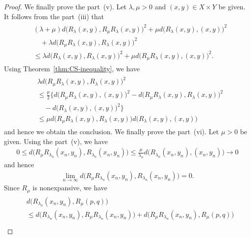 \documentclass[draft]{amsart}
\numberwithin{equation}{section}
\theoremstyle{plain}
\theoremstyle{definition}
\theoremstyle{remark}
\begin{document}
\begin{proof}
 We finally prove the part~(v). 
 Let $\lambda, \mu>0$ and $(x,y)\in X\times Y$ be given. 
 It follows from the part~(iii) that 
 \begin{align}
 \begin{split}
  &(\lambda+\mu)d\bigl(R_{\lambda}(x,y), R_{\mu}R_{\lambda}(x,y)\bigr)^2
 +\mu d\bigl(R_{\lambda}(x,y), (x,y)\bigr)^2 \\
  &\quad +\lambda d\bigl(R_{\mu}R_{\lambda}(x,y), R_{\lambda}(x,y)\bigr)^2 \\
  &\leq \lambda d\bigl(R_{\lambda}(x,y), R_{\lambda}(x,y)\bigr)^2
+\mu d\bigl(R_{\mu}R_{\lambda}(x,y), (x,y)\bigr)^2.   
 \end{split}
 \end{align} 
 Using Theorem~\ref{thm:CS-inequality}, we have 
 \begin{align}
 \begin{split}
  &\lambda d\bigl(R_{\mu}R_{\lambda}(x,y), R_{\lambda}(x,y)\bigr)^2 \\
  &\leq 
  \frac{\mu}{2}\bigl\{
  d\bigl(R_{\mu}R_{\lambda}(x,y), (x,y)\bigr)^2 
 - d\bigl(R_{\mu}R_{\lambda}(x,y),R_{\lambda}(x,y)\bigr)^2 \\
 &\quad - d\bigl(R_{\lambda}(x,y), (x,y)\bigr)^2 
  \bigr\} \\
  &\leq \mu d\bigl(R_{\mu}R_{\lambda}(x,y), R_{\lambda}(x,y)\bigr) 
d\bigl(R_{\lambda}(x,y), (x,y)\bigr)  
 \end{split}
 \end{align} 
 and hence we obtain the conclusion. 
 We finally prove the part~(vi). Let $\mu>0$ be given. 
 Using the part~(v), we have 
 \begin{align}
  0\leq 
  d\bigl(
  R_{\mu}R_{\lambda_n}(x_{n},y_{n}), R_{\lambda_n}(x_{n},y_{n})
  \bigr)
  \leq \frac{\mu}{\lambda_n}
  d\bigl(
  R_{\lambda_n}(x_{n},y_{n}), (x_{n},y_{n})
  \bigr)\to 0
 \end{align}
 and hence 
 \begin{align}
  \lim_{n\to \infty}d\bigl(
  R_{\mu}R_{\lambda_n}(x_{n},y_{n}), R_{\lambda_n}(x_{n},y_{n})
  \bigr)=0. 
 \end{align}
 Since $R_{\mu}$ is nonexpansive, we have 
 \begin{align}
 \begin{split}
  &d\bigl(
  R_{\lambda_n}(x_{n},y_{n}), R_{\mu}(p,q)
  \bigr) \\
  &\leq 
  d\bigl(
  R_{\lambda_n}(x_{n},y_{n}), R_{\mu}R_{\lambda_n}(x_{n},y_{n})
  \bigr) 
 + d\bigl(
  R_{\mu}R_{\lambda_n}(x_{n},y_{n}), R_{\mu}(p,q)
  \bigr) \\

\end{split}
\end{align}
\end{proof}
\end{document}
